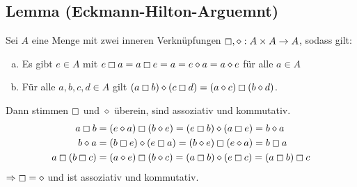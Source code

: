 \subsection{Lemma (Eckmann-Hilton-Arguemnt)} %
\label{sub:145}
Sei $A$ eine Menge mit zwei inneren Verknüpfungen $\boxempty, \diamond : A \times A\to A $, sodass gilt:
\begin{enumerate}[a)]
	\item Es gibt $e \in A$ mit $e \boxempty a = a \boxempty e = a = e \diamond a = a \diamond e$ für alle $a \in A$
	\item Für alle $a,b,c,d \in A$ gilt $(a \boxempty b) \diamond (c \boxempty d) = (a \diamond c) \boxempty (b \diamond d)$.
\end{enumerate}
Dann stimmen $\boxempty$ und $\diamond $ überein, sind assoziativ und kommutativ.
\begin{align*}
	a \boxempty b &= (e \diamond a) \boxempty (b \diamond e) = (e \boxempty b) \diamond (a \boxempty e) = b \diamond a \\
	b \diamond a &= (b \boxempty e) \diamond (e \boxempty a) = (b \diamond e) \boxempty (e \diamond a) = b \boxempty a \\
	a \boxempty (b \boxempty c) &= (a \diamond e) \boxempty (b \diamond c) = (a \boxempty b) \diamond (e \boxempty c) = (a \boxempty b) \boxempty c
\end{align*}
$\Rightarrow \boxempty = \diamond$ und ist assoziativ und kommutativ. \bewende

